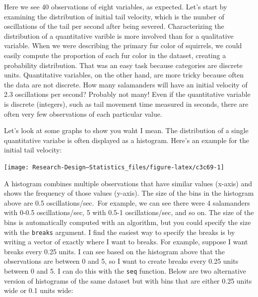 \documentclass[
]{book}
\newenvironment{Shaded}{\begin{snugshade}}{\end{snugshade}}
\newcommand{\AttributeTok}[1]{\textcolor[rgb]{0.13,0.29,0.53}{#1}}
\newcommand{\FunctionTok}[1]{\textcolor[rgb]{0.13,0.29,0.53}{\textbf{#1}}}
\newcommand{\NormalTok}[1]{#1}
\newcommand{\SpecialCharTok}[1]{\textcolor[rgb]{0.81,0.36,0.00}{\textbf{#1}}}
\newcommand{\StringTok}[1]{\textcolor[rgb]{0.31,0.60,0.02}{#1}}
\begin{document}
Here we see 40 observations of eight variables, as expected. Let's start by examining the distribution of initial tail velocity, which is the number of oscillations of the tail per second after being severed. Characterizing the distribution of a quantitative varible is more involved than for a qualitative variable. When we were describing the primary fur color of squirrels, we could easily compute the proportion of each fur color in the dataset, creating a probability distribution. That was an easy task because categories are discrete units. Quantitative variables, on the other hand, are more tricky because often the data are not discrete. How many salamanders will have an initial velocity of 2.3 oscillations per second? Probably not many! Even if the quantitative variable is discrete (integers), such as tail movement time measured in seconds, there are often very few observations of each particular value.

Let's look at some graphs to show you waht I mean. The distribution of a single quantitative variabe is often displayed as a histogram. Here's an example for the initial tail velocity:

\begin{Shaded}
\end{Shaded}

\begin{center}\texttt{[image: Research-Design---Statistics\_files/figure-latex/c3c69-1]} \end{center}

A histogram combines multiple observations that have similar values (x-axis) and shows the frequency of those values (y-axis). The size of the bins in the histogram above are 0.5 oscillations/sec.~For example, we can see there were 4 salamanders with 0-0.5 oscillations/sec, 5 with 0.5-1 oscillations/sec, and so on. The size of the bins is automatically computed with an algorithm, but you could specify the size with the \texttt{breaks} argument. I find the easiest way to specify the breaks is by writing a vector of exactly where I want to breaks. For example, suppose I want breaks every 0.25 units. I can see based on the histogram above that the observations are between 0 and 5, so I want to create breaks every 0.25 units between 0 and 5. I can do this with the \texttt{seq} function. Below are two alternative version of histograms of the same dataset but with bins that are either 0.25 units wide or 0.1 units wide:
\end{document}
